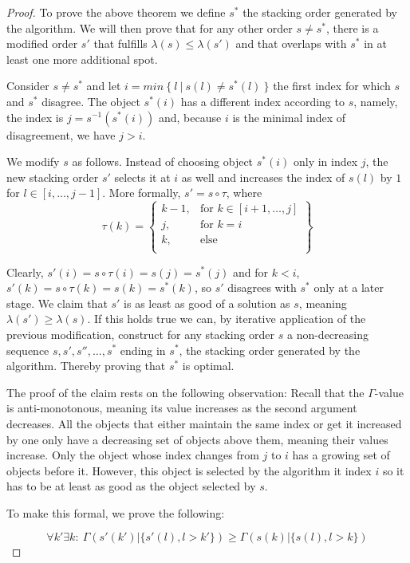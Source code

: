 \documentclass[a4paper,11pt]{article}
\begin{document}
\begin{proof}
To prove the above theorem we define $s^*$ the stacking order generated by the algorithm. We will then prove that for any other order $s\neq s^*$, there is a modified order $s'$ that fulfills $\lambda(s)\leq\lambda(s')$ and that overlaps with $s^*$ in at least one more additional spot.

Consider $s\neq s^*$ and let $i=min\ \{\ l\ |\ s(l)\neq s^*(l)\ \}$ the first index for which $s$ and $s^*$ disagree. The object $s^*(i)$ has a different index according to $s$, namely, the index is $j=s^{-1}(s^*(i))$ and, because $i$ is the minimal index of disagreement, we have $j>i$.

We modify $s$ as follows. Instead of choosing object $s^*(i)$ only in index $j$, the new stacking order $s'$ selects it at $i$ as well and increases the index of $s(l)$ by $1$ for $l\in [i,...,j-1]$. More formally, $s'=s\circ \tau$, where
\[
\tau(k) = \left\{\begin{array}{ll}
    k-1, & \text{for } k\in [i+1,\dots,j]\\
    j, & \text{for } k=i\\
    k, & \text{else}\\
    \end{array}\right\}
\]

Clearly, $s'(i) = s\circ\tau(i) = s(j) = s^*(j)$ and for $k<i$, $s'(k) = s\circ\tau(k) = s(k) = s^*(k)$, so $s'$ disagrees with $s^*$ only at a later stage. We claim that $s'$ is as least as good of a solution as $s$, meaning $\lambda(s')\geq\lambda(s)$. If this holds true we can, by iterative application of the previous modification, construct for any stacking order $s$ a non-decreasing sequence $s, s', s'', \dots, s^*$ ending in $s^*$, the stacking order generated by the algorithm. Thereby proving that $s^*$ is optimal.

The proof of the claim rests on the following observation: Recall that the $\Gamma$-value is anti-monotonous, meaning its value increases as the second argument decreases. All the objects that either maintain the same index or get it increased by one only have a decreasing set of objects above them, meaning their values increase. Only the object whose index changes from $j$ to $i$ has a growing set of objects before it. However, this object is selected by the algorithm it index $i$ so it has to be at least as good as the object selected by $s$.

To make this formal, we prove the following: 

\begin{equation}
    \forall k' \exists k:\ \Gamma(s'(k')|\{s'(l), l>k'\})\geq\Gamma(s(k)|\{s(l), l>k\})
\end{equation}


\end{proof}
\end{document}
